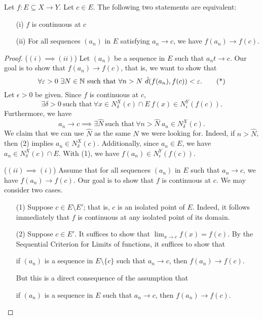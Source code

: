 \documentclass[a4paper]{article}
\begin{document}
\begin{theorem}
    Let \( f: E \subseteq X \to Y \). Let \( c \in E  \). The following two statements are equivalent:
    \begin{enumerate}
        \item[(i)] \( f  \) is continuous at \( c  \)
        \item[(ii)] For all sequences \( ({a}_{n}) \) in \( E  \) satisfying \( {a}_{n} \to c  \), we have \( f({a}_{n}) \to f(c) \).
    \end{enumerate}
\end{theorem}
\begin{proof}
    (\( (i) \implies (ii) \)) Let \( ({a}_{n}) \) be a sequence in \( E  \) such that \( {a}_{n} t\to c \). Our goal is to show that \( f({a}_{n}) \to f(c) \), that is, we want to show that 
    \[  \forall \varepsilon > 0 \ \exists N \in \mathbb{N} \ \text{such that} \ \forall n > N \ \tilde{d}(f({a}_{n}), f(c)) < \varepsilon. \tag{*} \]
    Let \( \epsilon > 0  \) be given. Since \( f  \) is continuous at \( c  \),
    \[  \exists \delta > 0 \ \text{such that} \ \forall x \in {N}_{\delta}^{X}(c) \cap E  \  f(x) \in {N}_{\epsilon}^{Y}(f(c)). \tag{1} \]
    Furthermore, we have 
    \[  {a}_{n} \to c \implies \exists \hat{N} \ \text{such that} \ \forall n > \hat{N} \ {a}_{n} \in {N}_{\delta}^{X}(c). \tag{2} \]
    We claim that we can use \( \hat{N} \) as the same \( N  \) we were looking for. Indeed, if \( n > \hat{N} \), then (2) implies \( {a}_{n} \in {N}_{\delta}^{X}(c) \). Additionally, since \( {a}_{n} \in E  \), we have \( {a}_{n} \in {N}_{\delta}^{X}(c) \cap E  \). With (1), we have \( f({a}_{n}) \in {N}_{\epsilon}^{Y}(f(c)) \).

    (\( (ii) \implies (i) \)) Assume that for all sequences \( ({a}_{n}) \) in \( E  \) such that \( {a}_{n} \to c  \), we have \( f({a}_{n}) \to f(c) \). Our goal is to show that \( f  \) is continuous at \( c  \). We may consider two cases.
    \begin{enumerate}
        \item[(1)] Suppose \( c \in E \setminus  E' \); that is, \( c  \) is an isolated point of \( E  \). Indeed, it follows immediately that \( f  \) is continuous at any isolated point of its domain.
        \item[(2)] Suppose \( c \in E' \). It suffices to show that \( \lim_{ x \to c } f(x) = f(c) \). By the Sequential Criterion for Limits of functions, it suffices to show that 
            \begin{center}
                if \( ({a}_{n}) \) is a sequence in \( E \setminus \{ c  \}  \) such that \( {a}_{n} \to c  \), then \( f({a}_{n}) \to f(c) \).
            \end{center}
            But this is a direct consequence of the assumption that 
            \begin{center}
                if \( ({a}_{n}) \) is a sequence in \( E  \) such that \( {a}_{n} \to c  \), then \( f({a}_{n}) \to f(c) \).
            \end{center}
    \end{enumerate}
\end{proof}
\end{document}

